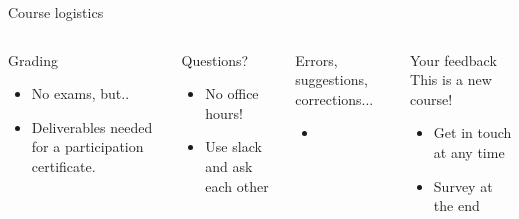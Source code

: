 \begin{frame}{Course logistics}
    
    \begin{columns}
   
        \begin{block}{Grading}
            \begin{itemize}
                \item No exams, but..
                \item Deliverables needed for a participation certificate. 
            \end{itemize}
        \end{block}

        \begin{block}{Questions?}
            \begin{itemize}
                \item No office hours!
                \item Use slack and ask each other
            \end{itemize}
        \end{block}

    
        \begin{block}{Errors, suggestions, corrections...}
            \begin{itemize}
                \item  {} 
            \end{itemize}
        \end{block}

        \begin{block}{Your feedback}
        This is a new course!
            \begin{itemize}
                \item Get in touch at any time
                \item Survey at the end
            \end{itemize}
        \end{block}

        \end{columns}
    
\end{frame}
